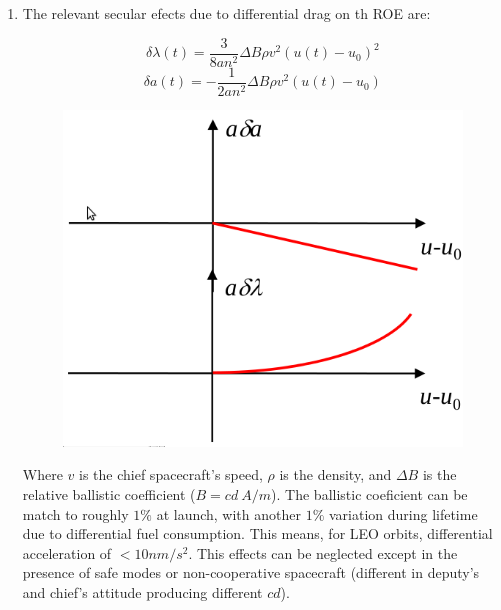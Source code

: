 \documentclass[a4paper]{report}
\begin{document}
\begin{enumerate}[label=\emph{\alph*)}]
  \item %
    The relevant secular efects due to differential drag on th ROE are:
    \begin{figure}[h]
      \begin{minipage}{0.5\textwidth}
	\[ \delta \lambda(t) = \frac{3}{8an^2} \Delta B \rho v^2 (u(t)-u_0)^2\]
	\[ \delta a(t) = -\frac{1}{2an^2}\Delta B \rho v^2(u(t)-u_0)\]
      \end{minipage}
      \begin{minipage}{0.5\textwidth}
         \centering
         \includegraphics[width=\textwidth]{secular_drag_effects}
      \end{minipage}
    \end{figure}
    Where $v$ is the chief spacecraft's speed, $\rho$ is the density, and $\Delta B$ is the relative ballistic coefficient ($B = cd~ A/m$). The ballistic coeficient can be match to roughly $1\%$ at launch, with another $1\%$ variation during lifetime due to differential fuel consumption. This means, for LEO orbits, differential acceleration of $<10 nm/s^2$. This effects can be neglected except in the presence of safe modes or non-cooperative spacecraft (different in deputy's and chief's attitude producing different $cd$).



\end{enumerate}
\end{document}
